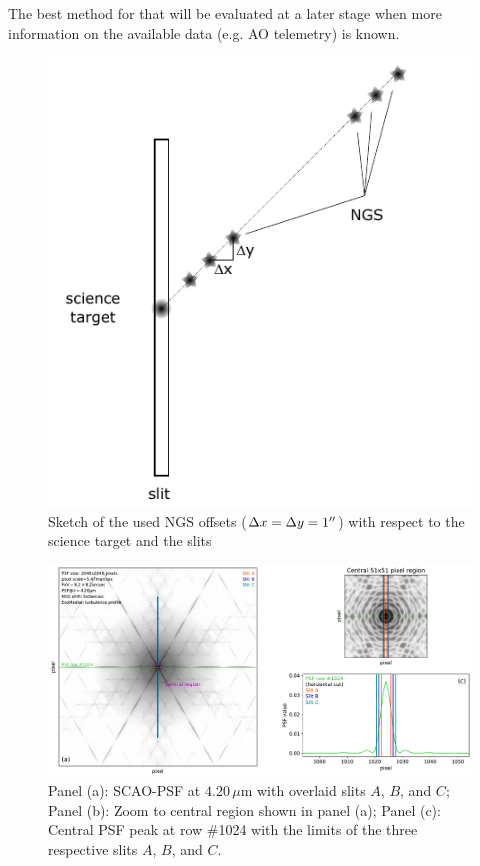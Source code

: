 The best method for that will be evaluated at a later stage when more information on the available data (e.g. \ac{AO} telemetry) is known.
\begin{figure}[ht!]
  \centering
  \includegraphics[width=0.5\linewidth]{figures/LSS_CrtAlg_files/ngs_offsets.pdf}
  \caption{Sketch of the used \ac{NGS} offsets ($\Delta x=\Delta y=1\hbox{$^{\prime\prime}$}$) with respect to the science target and the slits}
  \label{fig:ngsoffsets}
\end{figure}

\begin{landscape}
\begin{figure}[ht!]
  \centering
  \includegraphics[width=1.0\linewidth]{figures/LSS_CrtAlg_files/SCAOPSF_L-band_4.20mum_slits_ABC_0x0_shift.pdf}
  \caption{Panel (a): \ac{SCAO}-\ac{PSF} at $4.20\,\mu$m with overlaid slits $A$, $B$, and $C$; Panel (b): Zoom to central region shown in panel (a); Panel (c): Central \ac{PSF} peak at row \#1024 with the limits of the three respective slits $A$, $B$, and $C$.}
  \label{fig:scaopsfslits}
\end{figure}
\end{landscape}

